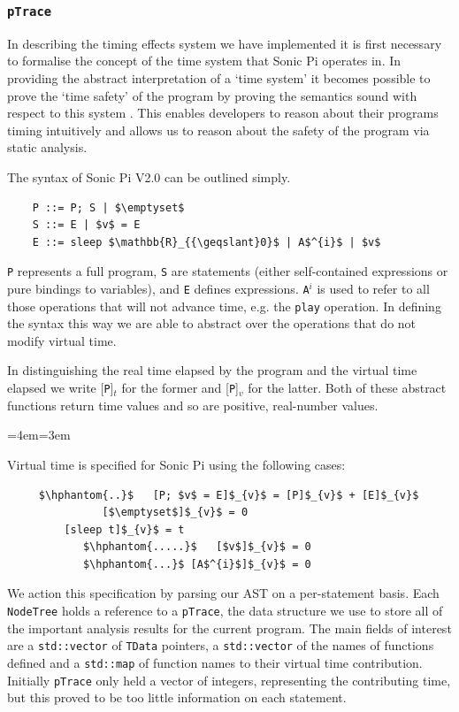 \documentclass[11pt, abstracton, twoside]{scrartcl}
\newenvironment{blockquote}{
	\par
	\medskip
	\leftskip=4em\rightskip=3em
	\noindent\ignorespaces
}{
	\par\medskip
}
\begin{document}

\subsubsection{\texttt{pTrace}}
In describing the timing effects system we have implemented it is first necessary
to formalise the concept of the time system that Sonic Pi operates in. In providing
the abstract interpretation of a `time system' it becomes possible to prove the
`time safety' of the program by proving the semantics sound with respect to this 
system \cite{AOB14}. This enables developers to reason about their programs timing 
intuitively and allows us to reason about the safety of the program via static 
analysis.

The syntax of Sonic Pi V2.0 can be outlined simply.
\\
\begin{lstlisting}
	P ::= P; S | $\emptyset$
	S ::= E | $v$ = E
	E ::= sleep $\mathbb{R}_{{\geqslant}0}$ | A$^{i}$ | $v$
\end{lstlisting}

\texttt{P} represents a full program, 
\texttt{S} are statements (either self-contained expressions or pure bindings 
to variables), and \texttt{E} defines expressions. \texttt{A$^{i}$} is used to 
refer to all those operations that will not advance time, e.g. the 
\texttt{play} operation. In defining the syntax this way we are able to abstract 
over the operations that do not modify virtual time.

In distinguishing the real time elapsed by the program and the virtual time elapsed 
we write [\texttt{P}]$_{t}$ for the former and [\texttt{P}]$_{v}$ for the latter. 
Both of these abstract functions return time values and so are positive, 
real-number values.

\begin{blockquote}
	Virtual time is specified for Sonic Pi using the following cases:

	\begin{lstlisting}
     $\hphantom{..}$   [P; $v$ = E]$_{v}$ = [P]$_{v}$ + [E]$_{v}$
               [$\emptyset$]$_{v}$ = 0
         [sleep t]$_{v}$ = t
            $\hphantom{.....}$   [$v$]$_{v}$ = 0
            $\hphantom{...}$ [A$^{i}$]$_{v}$ = 0
	\end{lstlisting}
\end{blockquote}

We action this specification by parsing our AST on a per-statement basis. Each 
\texttt{NodeTree} holds a reference to a \texttt{pTrace}, the data structure we 
use to store all of the important analysis results for the current program. The 
main fields of interest are a \texttt{std::vector} of \texttt{TData} pointers, a
\texttt{std::vector} of the names of functions defined and a \texttt{std::map} of 
function names to their virtual time contribution. Initially \texttt{pTrace} only
held a vector of integers, representing the contributing time, but this proved to 
be too little information on each statement. 
\end{document}
